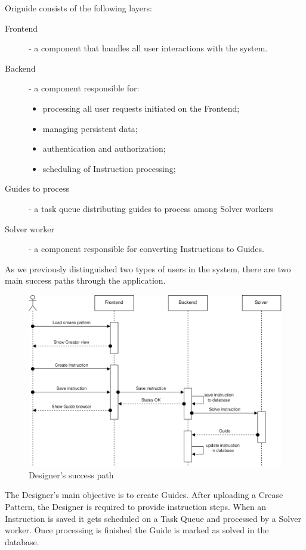 Origuide consists of the following layers:
\begin{description}
	\item[Frontend] - a component that handles all user interactions with the system. 
	\item[Backend] - a component responsible for: \begin{itemize}
		\item processing all user requests initiated on the Frontend;
		\item managing persistent data;
		\item authentication and authorization;
		\item scheduling of Instruction processing;
	\end{itemize}
	\item[Guides to process] - a task queue distributing guides to process among Solver workers
	\item[Solver worker] - a component responsible for converting Instructions to Guides.
\end{description}

As we previously distinguished two types of users in the system, there are two main success paths through the application.

\begin{figure}[H]
	\caption{Designer's success path}
  \centering
    \includegraphics[width=\textwidth]{assets/3-designer-flow.png}
\end{figure}

The Designer's main objective is to create Guides. After uploading a Crease Pattern, the Designer is required to provide instruction steps. When an Instruction is saved it gets scheduled on a Task Queue and processed by a Solver worker. Once processing is finished the Guide is marked as solved in the database.

